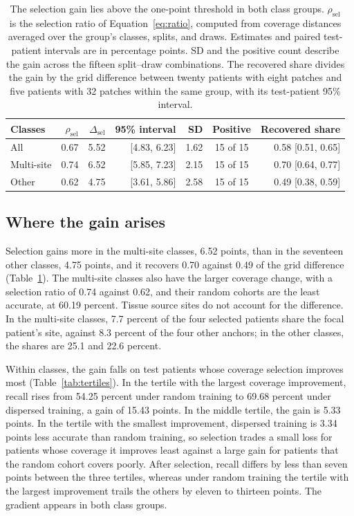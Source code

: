 \begin{table}[htbp]
\centering
\small
\renewcommand{\arraystretch}{1.15}
\begin{tabular}{@{}lrrrrcr@{}}
\toprule
Classes & $\rho_{\mathrm{sel}}$ & $\Delta_{\mathrm{sel}}$ & 95\% interval & SD & Positive & Recovered share \\
\midrule
All & 0.67 & 5.52 & [4.83, 6.23] & 1.62 & 15 of 15 & 0.58 [0.51, 0.65] \\
Multi-site & 0.74 & 6.52 & [5.85, 7.23] & 2.15 & 15 of 15 & 0.70 [0.64, 0.77] \\
Other & 0.62 & 4.75 & [3.61, 5.86] & 2.58 & 15 of 15 & 0.49 [0.38, 0.59] \\
\bottomrule
\end{tabular}
\caption{The selection gain lies above the one-point threshold in both class groups. $\rho_{\mathrm{sel}}$ is the selection ratio of Equation~\eqref{eq:ratio}, computed from coverage distances averaged over the group's classes, splits, and draws. Estimates and paired test-patient intervals are in percentage points. SD and the positive count describe the gain across the fifteen split--draw combinations. The recovered share divides the gain by the grid difference between twenty patients with eight patches and five patients with 32 patches within the same group, with its test-patient 95\% interval.}
\label{tab:contrasts}
\end{table}

\subsection{Where the gain arises}
\label{sec:gain-location}
Selection gains more in the multi-site classes, 6.52 points, than in the seventeen other classes, 4.75 points, and it recovers 0.70 against 0.49 of the grid difference (Table~\ref{tab:contrasts}). The multi-site classes also have the larger coverage change, with a selection ratio of 0.74 against 0.62, and their random cohorts are the least accurate, at 60.19 percent. Tissue source sites do not account for the difference. In the multi-site classes, 7.7 percent of the four selected patients share the focal patient's site, against 8.3 percent of the four other anchors; in the other classes, the shares are 25.1 and 22.6 percent.

Within classes, the gain falls on test patients whose coverage selection improves most (Table~\ref{tab:tertiles}). In the tertile with the largest coverage improvement, recall rises from 54.25 percent under random training to 69.68 percent under dispersed training, a gain of 15.43 points. In the middle tertile, the gain is 5.33 points. In the tertile with the smallest improvement, dispersed training is 3.34 points less accurate than random training, so selection trades a small loss for patients whose coverage it improves least against a large gain for patients that the random cohort covers poorly. After selection, recall differs by less than seven points between the three tertiles, whereas under random training the tertile with the largest improvement trails the others by eleven to thirteen points. The gradient appears in both class groups.

